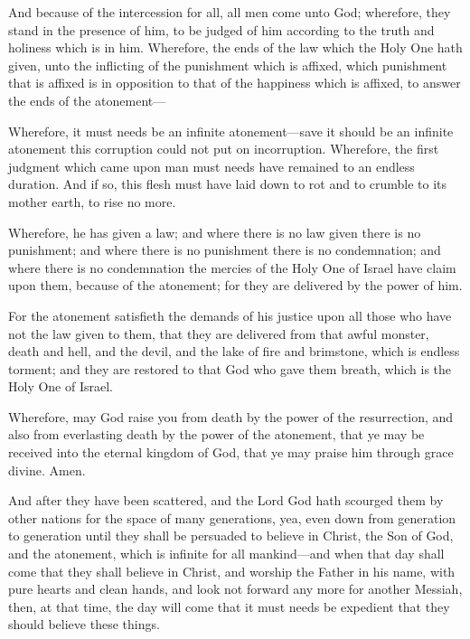 		\begin{compactdesc}
			\item[2 Nephi 2:10] And because of the intercession for all, all men come unto God; wherefore, they stand in the presence of him, to be judged of him according to the truth and holiness which is in him. Wherefore, the ends of the law which the Holy One hath given, unto the inflicting of the punishment which is affixed, which punishment that is affixed is in opposition to that of the happiness which is affixed, to answer the ends of the atonement---
			\item[2 Nephi 9:7] Wherefore, it must needs be an infinite atonement---save it should be an infinite atonement this corruption could not put on incorruption. Wherefore, the first judgment which came upon man must needs have remained to an endless duration. And if so, this flesh must have laid down to rot and to crumble to its mother earth, to rise no more.
			\item[2 Nephi 9:25] Wherefore, he has given a law; and where there is no law given there is no punishment; and where there is no punishment there is no condemnation; and where there is no condemnation the mercies of the Holy One of Israel have claim upon them, because of the atonement; for they are delivered by the power of him.
			\item[2 Nephi 9:26] For the atonement satisfieth the demands of his justice upon all those who have not the law given to them, that they are delivered from that awful monster, death and hell, and the devil, and the lake of fire and brimstone, which is endless torment; and they are restored to that God who gave them breath, which is the Holy One of Israel.
			\item[2 Nephi 10:25] Wherefore, may God raise you from death by the power of the resurrection, and also from everlasting death by the power of the atonement, that ye may be received into the eternal kingdom of God, that ye may praise him through grace divine. Amen.
			\item[2 Nephi 25:16] And after they have been scattered, and the Lord God hath scourged them by other nations for the space of many generations, yea, even down from generation to generation until they shall be persuaded to believe in Christ, the Son of God, and the atonement, which is infinite for all mankind---and when that day shall come that they shall believe in Christ, and worship the Father in his name, with pure hearts and clean hands, and look not forward any more for another Messiah, then, at that time, the day will come that it must needs be expedient that they should believe these things.

\end{compactdesc}
